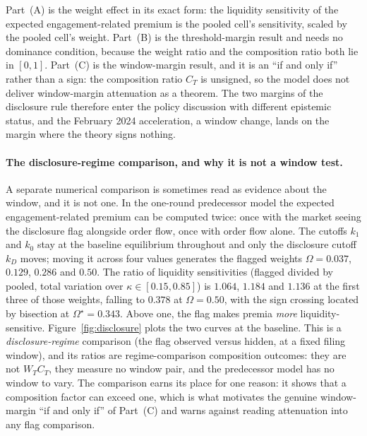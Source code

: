 \documentclass[11pt]{article}
\begin{document}
Part~(A) is the weight effect in its exact form: the liquidity sensitivity of the expected
engagement-related premium is the pooled cell's sensitivity, scaled by the pooled cell's weight.
Part~(B) is the threshold-margin result and needs no dominance condition, because the weight ratio
and the composition ratio both lie in $[0,1]$. Part~(C) is the window-margin result, and it is an
``if and only if'' rather than a sign: the composition ratio $C_T$ is unsigned, so the model does
not deliver window-margin attenuation as a theorem. The two margins of the disclosure rule therefore
enter the policy discussion with different epistemic status, and the February 2024 acceleration,
a window change, lands on the margin where the theory signs nothing.

\paragraph{The disclosure-regime comparison, and why it is not a window test.}
A separate numerical comparison is sometimes read as evidence about the window, and it is not one. In
the one-round predecessor model the expected engagement-related
premium can be computed twice: once with the market seeing the disclosure flag alongside order
flow, once with order flow alone. The cutoffs $k_1$ and $k_0$ stay at the baseline equilibrium
throughout and only the disclosure cutoff $k_D$ moves; moving it across four values generates the
flagged weights $\Omega = 0.037$, $0.129$, $0.286$ and $0.50$. The ratio of liquidity sensitivities
(flagged divided by pooled,
total variation over $\kappa \in [0.15,0.85]$) is $1.064$, $1.184$ and $1.136$ at the first three
of those weights, falling to $0.378$ at $\Omega = 0.50$, with the sign crossing
located by bisection at $\Omega^\star = 0.343$. Above one, the flag makes premia \emph{more}
liquidity-sensitive. Figure~\ref{fig:disclosure} plots the two curves at the baseline. This is a
\emph{disclosure-regime} comparison (the flag observed versus hidden, at a fixed filing window),
and its ratios are regime-comparison composition outcomes: they are not $W_T C_T$, they measure no
window pair, and the predecessor model has no window to vary. The comparison earns its place for one
reason: it shows that a composition factor can exceed one, which is what motivates the genuine
window-margin ``if and only if'' of Part~(C) and warns against reading attenuation into any flag
comparison.
\end{document}
